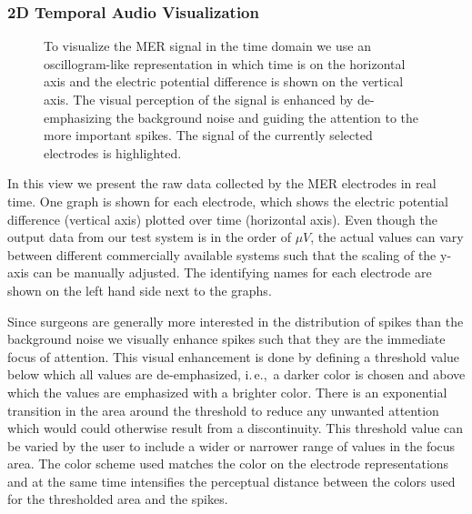 \documentclass{vgtc}                          %
\begin{document}
\subsubsection{2D Temporal Audio Visualization}\label{sec:overview:recording:mer}
\begin{figure}[b]
    \centering
    \caption{To visualize the MER signal in the time domain we use an oscillogram-like representation in which time is on the horizontal axis and the electric potential difference is shown on the vertical axis. The visual perception of the signal is enhanced by de-emphasizing the background noise and guiding the attention to the more important spikes. The signal of the currently selected electrodes is highlighted.}
    \label{fig:recordingphase:sound}
\end{figure}

In this view we present the raw data collected by the MER electrodes in real time. One graph is shown for each electrode, which shows the electric potential difference (vertical axis) plotted over time (horizontal axis). Even though the output data from our test system is in the order of $\mu V$, the actual values can vary between different commercially available systems such that the scaling of the y-axis can be manually adjusted. The identifying names for each electrode are shown on the left hand side next to the graphs.

Since surgeons are generally more interested in the distribution of spikes than the background noise we visually enhance spikes such that they are the immediate focus of attention. This visual enhancement is done by defining a threshold value below which all values are de-emphasized, i.\,e.,~a darker color is chosen and above which the values are emphasized with a brighter color. There is an exponential transition in the area around the threshold to reduce any unwanted attention which would could otherwise result from a discontinuity. This threshold value can be varied by the user to include a wider or narrower range of values in the focus area. The color scheme used matches the color on the electrode representations and at the same time intensifies the perceptual distance between the colors used for the thresholded area and the spikes.
\end{document}
